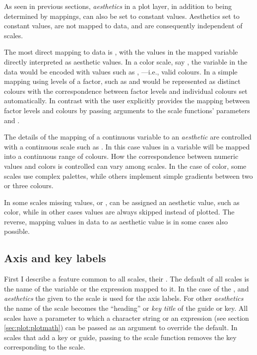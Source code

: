 \documentclass[krantz2]{krantz}\usepackage{knitr}
\begin{document}
\begin{warningbox}
As seen in previous sections, \emph{aesthetics} in a plot layer, in addition to being determined by mappings, can also be set to constant values. Aesthetics set to constant values, are not mapped to data, and are consequently independent of scales.
\end{warningbox}

The most direct mapping to data is , with the values in the mapped variable directly interpreted as aesthetic values. In a color scale, say , the variable in the data would be encoded with values such as , ---i.e., valid \Rlang colours. In a simple mapping using  levels of a factor, such as  and  would be represented as distinct colours with the correspondence between factor levels and individual colours set automatically. In contrast with  the user explicitly provides the mapping between factor levels and colours by passing arguments to the scale functions' parameters  and .

The details of the mapping of a continuous variable to an \emph{aesthetic} are controlled with a continuous scale such as . In this case values in a  variable will be mapped into a continuous range of colours. How the correspondence between numeric values and colors is controlled can vary among scales. In the case of color, some scales use complex palettes, while others implement simple gradients between two or three colours.

\begin{explainbox}
In some scales missing values, or , can be assigned an aesthetic value, such as color, while in other cases  values are always skipped instead of plotted. The reverse, mapping values in data to  as aesthetic value is in some cases also possible.
\end{explainbox}

\subsection{Axis and key labels}\label{sec:plot:scale:name}\label{sec:plot:labs}
First I describe a feature common to all scales, their . The default  of all scales is the name of the variable or the expression mapped to it. In the case of the ,  and  \emph{aesthetics} the  given to the scale is used for the axis labels. For other \emph{aesthetics} the name of the scale becomes the ``heading'' or \emph{key title} of the guide or key. All scales have a  parameter to which a character string or an \Rlang expression (see section \ref{sec:plot:plotmath}) can be passed as an argument to override the default. In scales that add a key or guide, passing  to the scale function removes the key corresponding to the scale.
\end{document}
